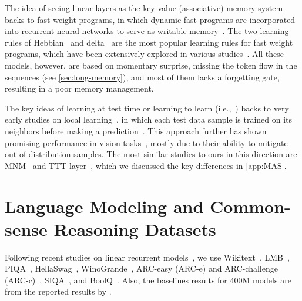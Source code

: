 \documentclass{article}
\newcommand{\citep}{\parencite}
\newcommand{\citet}{\textcite}
\newcommand{\head}[1]{\vspace{1.7mm}\noindent{{\textcolor{c3}{\bf #1.}}}}
\begin{document}
\head{Fast Weight Programs}
The idea of seeing linear layers as the key-value (associative) memory system backs to fast weight programs, in which dynamic fast programs are incorporated into recurrent neural networks to serve as writable memory~\citep{schlag2021linear, schmidhuber1992learning, schmidhuber1993reducing}. The two learning rules of Hebbian~\citep{hebb2005organization} and delta~\citep{prados1989neural} are the most popular learning rules for fast weight programs, which have been extensively explored in various studies~\citep{munkhdalai2017neural, schmidhuber1992learning, munkhdalai2019metalearned, schlag2021linear, irie2021going, yang2024parallelizing, yang2024gated}. All these models, however, are based on momentary surprise, missing the token flow in the sequences (see \autoref{sec:long-memory}), and most of them lacks a forgetting gate, resulting in a poor memory management. 

\head{Test Time Training}
The key ideas of learning at test time or learning to learn (i.e.,~\citep{andrychowicz2016learning}) backs to very early studies on local learning~\cite{bottou1992local}, in which each test data sample is trained on its neighbors before making a prediction~\citep{zhang2006svm, gandelsman2022test}. This approach further has shown promising performance in vision tasks~\citep{jain2011online, mullapudi2019online}, mostly due to their ability to mitigate out-of-distribution samples. The most similar studies to ours in this direction are MNM~\citep{munkhdalai2019metalearned} and TTT-layer~\citep{sun2024learning}, which we discussed the key differences in \autoref{app:MAS}. 

\section{Language Modeling and Common-sense Reasoning Datasets}\label{app:exp-details}
Following recent studies on linear recurrent models~\citep{yang2024gated, dao2024transformers, yang2024parallelizing}, we use Wikitext~\citep{merity2017pointer}, LMB~\citep{paperno-etal-2016-lambada}, PIQA~\citep{bisk2020piqa}, HellaSwag~\citep{zellers-etal-2019-hellaswag}, WinoGrande~\citep{sakaguchi2021winogrande},  ARC-easy (ARC-e) and ARC-challenge (ARC-c)~\citep{clark2018think}, SIQA~\citep{sap-etal-2019-social}, and BoolQ~\citep{clark-etal-2019-boolq}. Also, the baselines results for 400M models are from the reported results by \citet{yang2024gated}. 
\end{document}
